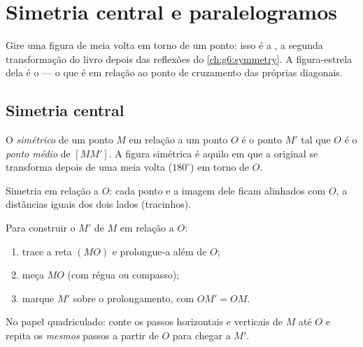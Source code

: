 \chapter{Simetria central e paralelogramos}\label{ch:g7:central}

Gire uma figura de meia volta em torno de um ponto: isso é a
\emph{}, a segunda transformação do livro depois das
reflexões do \cref{ch:g6:symmetry}. A figura-estrela dela é o
 --- o  que é  em relação ao ponto de
cruzamento das próprias diagonais.

\section{Simetria central}

\begin{definition}\label{def:g7:central:def}
O \emph{simétrico} de um ponto $M$ em relação a
um ponto $O$ é o ponto $M'$ tal que $O$ é o \emph{ponto médio} de
$[MM']$. A figura simétrica é aquilo em que a original se transforma
depois de uma meia volta ($180^\circ$) em torno de $O$.
\end{definition}

\begin{omfigure}

{\small Simetria em relação a $O$: cada ponto e a imagem dele ficam
alinhados com $O$, a distâncias iguais dos dois lados (tracinhos).}
\end{omfigure}

\begin{method}\label{met:g7:central:construct}
Para construir o  $M'$ de $M$ em relação a $O$:
\begin{enumerate}
  \item trace a reta $(MO)$ e prolongue-a além de $O$;
  \item meça $MO$ (com régua ou compasso);
  \item marque $M'$ sobre o prolongamento, com $OM' = OM$.
\end{enumerate}
No papel quadriculado: conte os passos horizontais e verticais de $M$
até $O$ e repita os \emph{mesmos} passos a partir de $O$ para chegar a
$M'$.
\end{method}

